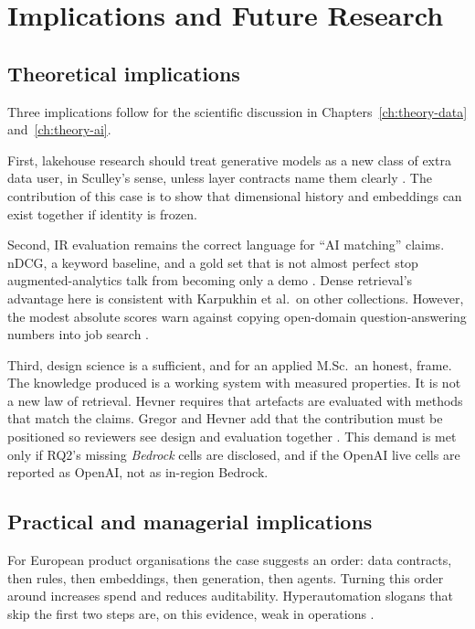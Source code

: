 \chapter{Implications and Future Research}
\label{ch:implications}

\section{Theoretical implications}
\label{sec:theory-impl}

Three implications follow for the scientific discussion in Chapters~\ref{ch:theory-data} and~\ref{ch:theory-ai}.

First, lakehouse research should treat generative models as a new class of extra data user, in Sculley's sense, unless layer contracts name them clearly . The contribution of this case is to show that dimensional history and embeddings can exist together if identity is frozen.

Second, IR evaluation remains the correct language for ``AI matching'' claims. nDCG, a keyword baseline, and a gold set that is not almost perfect stop augmented-analytics talk from becoming only a demo . Dense retrieval's advantage here is consistent with Karpukhin et al.\ on other collections. However, the modest absolute scores warn against copying open-domain question-answering numbers into job search .

Third, design science is a sufficient, and for an applied M.Sc.\ an honest, frame. The knowledge produced is a working system with measured properties. It is not a new law of retrieval. Hevner requires that artefacts are evaluated with methods that match the claims. Gregor and Hevner add that the contribution must be positioned so reviewers see design and evaluation together . This demand is met only if RQ2's missing \emph{Bedrock} cells are disclosed, and if the OpenAI live cells are reported as OpenAI, not as in-region Bedrock.

\section{Practical and managerial implications}
\label{sec:practical-impl}

For European product organisations the case suggests an order: data contracts, then rules, then embeddings, then generation, then agents. Turning this order around increases spend and reduces auditability. Hyperautomation slogans that skip the first two steps are, on this evidence, weak in operations .

